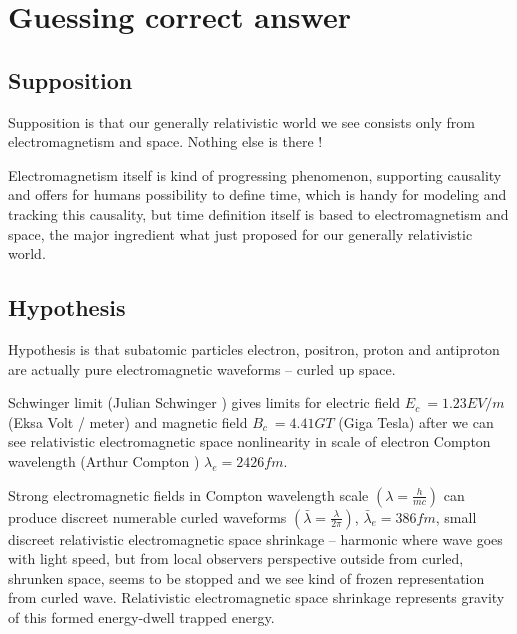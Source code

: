 %
%
%

\chapter{Guessing correct answer}
\section{Supposition}
\label{supposition}
Supposition is that our generally relativistic world we see consists only from
electromagnetism and space. %
Nothing else is there !

Electromagnetism itself is kind of progressing phenomenon, supporting
causality and offers for humans possibility to define time, which is handy for
modeling and tracking this causality, but time definition itself is based to
electromagnetism and space, the major ingredient what just proposed for our
generally relativistic world.


\section{Hypothesis}
\label{hypothesis}

Hypothesis is that subatomic particles electron, positron, proton and
antiproton are actually pure electromagnetic waveforms -- curled up space.

Schwinger limit (Julian Schwinger \cite{SchwingerLimit}) gives limits for
electric field $E_c~=1.23 EV/m$ (Eksa Volt / meter) and magnetic field
$B_c~=4.41 GT$ (Giga Tesla) after we can see relativistic electromagnetic
space nonlinearity in scale of electron Compton wavelength
(Arthur Compton \cite{ComptonWavelength}) $\lambda_e=2426 fm$.


Strong electromagnetic fields in Compton wavelength scale
$(\lambda=\frac{h}{mc})$
can produce discreet numerable curled waveforms
$(\bar{\lambda}=\frac{\lambda}{2\pi})$,
$\bar{\lambda}_e=386 fm$,
small discreet relativistic electromagnetic space shrinkage -- harmonic
where wave goes with light speed, but from local observers perspective outside
from curled, shrunken space, seems to be stopped and we see kind of frozen
representation from curled wave. Relativistic electromagnetic space shrinkage
represents gravity of this formed energy-dwell trapped energy.

